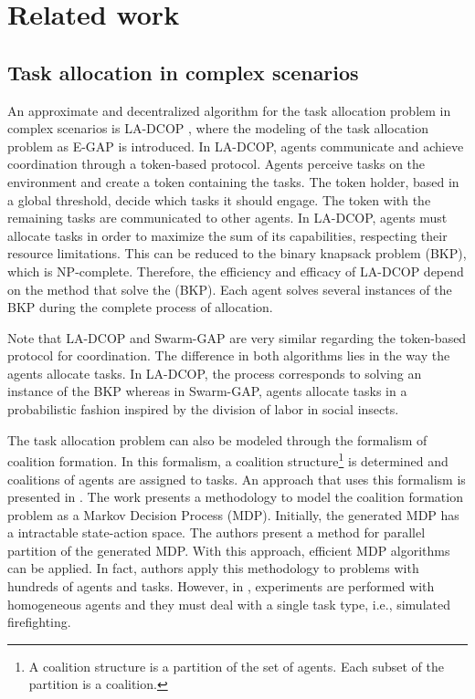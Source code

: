 \documentclass[conference]{IEEEtran}
\begin{document}
\section{Related work}
\label{sec:related}

\subsection{Task allocation in complex scenarios}
\label{sec:related_ta}

An approximate and decentralized algorithm for the task allocation problem in complex scenarios is LA-DCOP \cite{Scerri+2005}, where the modeling of the task allocation problem as E-GAP is introduced. In LA-DCOP, agents communicate and achieve coordination through a token-based protocol. Agents perceive tasks on the environment and create a token containing the tasks. The token holder, based in a global threshold, decide which tasks it should engage. The token with the remaining tasks are communicated to other agents. In LA-DCOP, agents must allocate tasks in order to maximize the sum of its capabilities, respecting their resource limitations. This can be reduced to the binary knapsack problem (BKP), which is NP-complete. Therefore, the efficiency and efficacy of LA-DCOP depend on the method that solve the (BKP). Each agent solves several instances of the BKP during the complete process of allocation.

Note that LA-DCOP and Swarm-GAP are very similar regarding the token-based protocol for coordination. The difference in both algorithms lies in the way the agents allocate tasks. In LA-DCOP, the process corresponds to solving an instance of the BKP whereas in Swarm-GAP, agents allocate tasks in a probabilistic fashion inspired by the division of labor in social insects.

The task allocation problem can also be modeled through the formalism of coalition formation. In this formalism, a coalition structure\footnote{A coalition structure is a partition of the set of agents. Each subset of the partition is a coalition.} is determined and coalitions of agents are assigned to tasks. An approach that uses this formalism is presented in \cite{Khan+2010}. The work presents a methodology to model the coalition formation problem as a Markov Decision Process (MDP). Initially, the generated MDP has a intractable state-action space. The authors present a method for parallel partition of the generated MDP. With this approach, efficient MDP algorithms can be applied. In fact, authors apply this methodology to problems with hundreds of agents and tasks. However, in \cite{Khan+2010}, experiments are performed with homogeneous agents and they must deal with a single task type, i.e., simulated firefighting.
\end{document}
